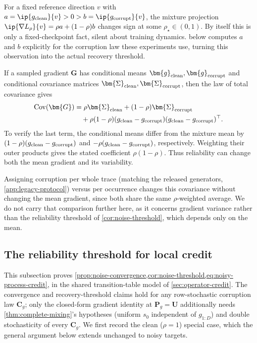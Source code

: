 For a fixed reference direction $v$ with $a=\ip{g_{\rm clean}}{v}>0>b=\ip{g_{\rm corrupt}}{v}$,
the mixture projection $\ip{\nabla L_\rho}{v}=\rho a+(1-\rho)b$ changes sign at
some $\rho_\star\in(0,1)$. By itself this is only a fixed-checkpoint fact,
silent about training dynamics.  below
computes $a$ and $b$ explicitly for the corruption law these experiments
use, turning this observation into the actual recovery threshold.

If a sampled gradient $\bm{G}$ has conditional means $\bm{g}_{\rm clean},\bm{g}_{\rm corrupt}$
and conditional covariance matrices $\bm{\Sigma}_{\rm clean},\bm{\Sigma}_{\rm corrupt}$,
then the law of total covariance gives
\begin{align}
 \operatorname{Cov}(\bm{G})
 &=\rho\bm{\Sigma}_{\rm clean}+(1-\rho)\bm{\Sigma}_{\rm corrupt}\\
 &\quad+\rho(1-\rho)(g_{\rm clean}-g_{\rm corrupt})
                         (g_{\rm clean}-g_{\rm corrupt})^\top.
 \label{eq:mixture-covariance}
\end{align}
To verify the last term, the conditional means differ from the mixture mean by
$(1-\rho)(g_{\rm clean}-g_{\rm corrupt})$ and
$-\rho(g_{\rm clean}-g_{\rm corrupt})$, respectively.  Weighting their outer
products gives the stated coefficient $\rho(1-\rho)$.  Thus reliability can
change both the mean gradient and its variability.

Assigning corruption per whole trace (matching the released generators,
\cref{app:legacy-protocol}) versus per occurrence changes this covariance
without changing the mean gradient, since both share the same
$\rho$-weighted average. We do not carry that comparison further here, as
it concerns gradient variance rather than the reliability threshold of
\cref{cor:noise-threshold}, which depends only on the mean.


\subsection{The reliability threshold for local credit}
\label{app:noise-threshold-proof}

This subsection proves
\cref{prop:noise-convergence,cor:noise-threshold,eq:noisy-process-credit},
in the shared transition-table model of \cref{sec:operator-credit}. The
convergence and recovery-threshold claims hold for any row-stochastic
corruption law $\bm{C}_g$; only the closed-form gradient identity at
$\bm{P}_g=\bm{U}$ additionally needs \cref{thm:complete-mixing}'s
hypotheses (uniform $s_0$ independent of $g_{1:D}$) and double
stochasticity of every $\bm{C}_g$. We
first record the clean ($\rho=1$) special case, which the general argument
below extends unchanged to noisy targets.

